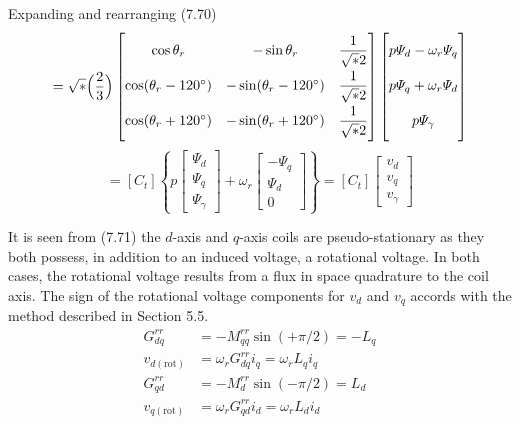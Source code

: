 \documentclass[a4paper,numbers=noenddot,12pt]{scrbook}
\begin{document}
        Expanding and rearranging (7.70)
        \begin{equation*}
            [v_{abc}] = \sqrt*{\Big( \dfrac{2}{3} \Big)}
            \begin{bmatrix}
                \cos \theta_r & -\sin \theta_r & \dfrac{1}{\sqrt*{2}} \\[2ex]
                \cos (\theta_r - 120^{\circ}) & -\sin (\theta_r - 120^{\circ}) & \dfrac{1}{\sqrt*{2}} \\[2ex]
                \cos (\theta_r + 120^{\circ}) & -\sin (\theta_r + 120^{\circ}) & \dfrac{1}{\sqrt*{2}}
            \end{bmatrix}
            \begin{bmatrix}
                p \varPsi_d - \omega_r \varPsi_q \vphantom{\dfrac{1}{\sqrt*{2}}} \\[2ex]
                p \varPsi_q + \omega_r \varPsi_d\vphantom{\dfrac{1}{\sqrt*{2}}} \\[2ex]
                p \varPsi_{\gamma} \vphantom{\dfrac{1}{\sqrt*{2}}}
            \end{bmatrix}
        \end{equation*}
        \begin{equation}
            [v_{abc}] = [C_t] 
            \left\{ p
                \begin{bmatrix}
                    \varPsi_d \\ \varPsi_q \\ \varPsi_{\gamma}
                \end{bmatrix}
                +
                \omega_r
                \begin{bmatrix}
                    - \varPsi_q \\ \varPsi_d \\ 0 
                \end{bmatrix}
            \right\} 
            = [C_t]
            \begin{bmatrix}
                v_d \\ v_q \\v_{\gamma}
            \end{bmatrix}
            \label{eq:Eq7.71}
        \end{equation}

        It is seen from (7.71) the $d$-axis and $q$-axis coils are pseudo-stationary as they both possess, in addition to an induced voltage, a rotational voltage. In both cases, the rotational voltage results from a flux in space quadrature to the coil axis. The sign of the rotational voltage components for $v_d$ and $v_q$ accords with the method described in Section 5.5.
        \begin{align*}
            G_{dq}^{rr} & = - M_{qq}^{rr} \sin (+ \pi/2) = -L_q \\
            v_{d(\text{rot})} & = \omega_r G_{dq}^{rr} i_q = \omega_r L_q i_q\\
            G_{qd}^{rr} & = - M_{d}^{rr} \sin (- \pi/2) = L_d \\
            v_{q(\text{rot})} & = \omega_r G_{qd}^{rr} i_d = \omega_r L_d i_d\\
        \end{align*}
\end{document}

